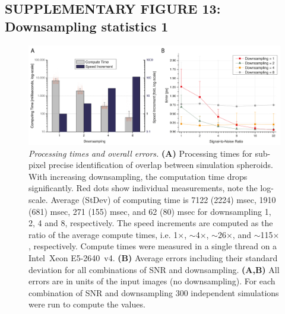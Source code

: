 \documentclass[]{spie}  %
\begin{document}
\subsection*{SUPPLEMENTARY FIGURE 13: Downsampling statistics 1}
\vspace{1mm}
\begin{figure}[h!]
\includegraphics[width=\textwidth]{fig-downsampling-statistics-0.png}
\vspace{-2.0mm}
\caption{\hspace{-0.5mm} \emph{Processing times and overall errors.} \textbf{(A)} Processing times for sub-pixel precise identification of overlap between simulation spheroids. With increasing downsampling, the computation time drops significantly. Red dots show individual measurements, note the log-scale. Average (StDev) of computing time is 7122 (2224) msec, 1910 (681) msec, 271 (155) msec, and 62 (80) msec for downsampling 1, 2, 4 and 8, respectively. The speed increments are computed as the ratio of the average compute times, i.e. 1$\times$, $\sim$4$\times$, $\sim$26$\times$, and $\sim$115$\times$, respectively. Compute times were measured in a single thread on a Intel~Xeon E5-2640~v4. \textbf{(B)} Average errors including their standard deviation for all combinations of SNR and downsampling. \textbf{(A,B)} All errors are in units of the input images (no downsampling). For each combination of SNR and downsampling 300 independent simulations were run to compute the values.
}
\label{fig:sup-fig-downsampling-statistics-0}
\end{figure}
\end{document}

